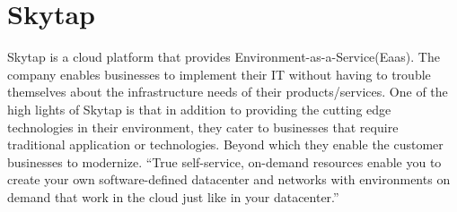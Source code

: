 \section{Skytap}

Skytap is a cloud platform that provides Environment-as-a-Service(Eaas). The
company enables businesses to implement their IT without having to
trouble themselves about the infrastructure needs of their products/services.
One of the high lights of Skytap is that in addition to providing the
cutting edge technologies in their environment, they cater to businesses that
require traditional application or technologies. Beyond which they enable the
customer businesses to modernize. ``True self-service, on-demand resources
enable you to create your own software-defined datacenter and networks with
environments on demand that work in the cloud just like in your 
datacenter.''~\cite{hid-sp18-411-skytap}
